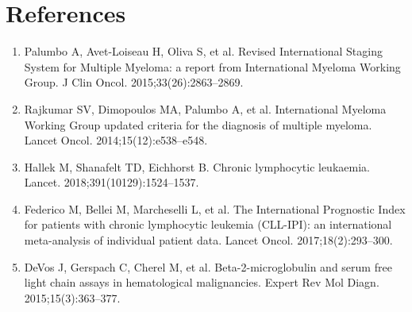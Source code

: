 \section*{References}
\begin{enumerate}
  \item Palumbo A, Avet-Loiseau H, Oliva S, et al. Revised International Staging System for Multiple Myeloma: a report from International Myeloma Working Group. J Clin Oncol. 2015;33(26):2863--2869.
  \item Rajkumar SV, Dimopoulos MA, Palumbo A, et al. International Myeloma Working Group updated criteria for the diagnosis of multiple myeloma. Lancet Oncol. 2014;15(12):e538--e548.
  \item Hallek M, Shanafelt TD, Eichhorst B. Chronic lymphocytic leukaemia. Lancet. 2018;391(10129):1524--1537.
  \item Federico M, Bellei M, Marcheselli L, et al. The International Prognostic Index for patients with chronic lymphocytic leukemia (CLL-IPI): an international meta-analysis of individual patient data. Lancet Oncol. 2017;18(2):293--300.
  \item DeVos J, Gerspach C, Cherel M, et al. Beta-2-microglobulin and serum free light chain assays in hematological malignancies. Expert Rev Mol Diagn. 2015;15(3):363--377.
\end{enumerate}

\clearpage
